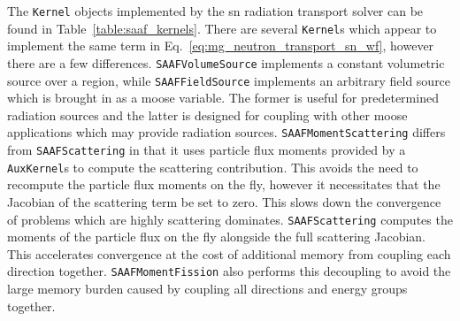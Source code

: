 The \texttt{Kernel} objects implemented by the \acrshort{sn} radiation transport solver can be found in Table~\ref{table:saaf_kernels}. There are several \texttt{Kernel}s which appear to implement the same term in Eq.~\ref{eq:mg_neutron_transport_sn_wf}, however there are a few differences. \texttt{SAAFVolumeSource} implements a constant volumetric source over a region, while \texttt{SAAFFieldSource} implements an arbitrary field source which is brought in as a \acrshort{moose} variable. The former is useful for predetermined radiation sources and the latter is designed for coupling with other \acrshort{moose} applications which may provide radiation sources. \texttt{SAAFMomentScattering} differs from \texttt{SAAFScattering} in that it uses particle flux moments provided by a \texttt{AuxKernel}s to compute the scattering contribution. This avoids the need to recompute the particle flux moments on the fly, however it necessitates that the Jacobian of the scattering term be set to zero. This slows down the convergence of problems which are highly scattering dominates. \texttt{SAAFScattering} computes the moments of the particle flux on the fly alongside the full scattering Jacobian. This accelerates convergence at the cost of additional memory from coupling each direction together. \texttt{SAAFMomentFission} also performs this decoupling to avoid the large memory burden caused by coupling all directions and energy groups together.

